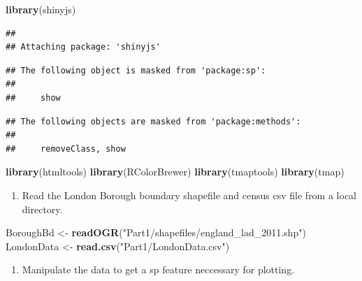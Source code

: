 \documentclass[]{article}
\newenvironment{Shaded}{\begin{snugshade}}{\end{snugshade}}
\newcommand{\KeywordTok}[1]{\textcolor[rgb]{0.13,0.29,0.53}{\textbf{#1}}}
\newcommand{\StringTok}[1]{\textcolor[rgb]{0.31,0.60,0.02}{#1}}
\newcommand{\NormalTok}[1]{#1}
\providecommand{\tightlist}{%
  \setlength{\itemsep}{0pt}\setlength{\parskip}{0pt}}
\begin{document}
\begin{Shaded}
\begin{Highlighting}[]
\KeywordTok{library}\NormalTok{(shinyjs)}
\end{Highlighting}
\end{Shaded}

\begin{verbatim}
## 
## Attaching package: 'shinyjs'
\end{verbatim}

\begin{verbatim}
## The following object is masked from 'package:sp':
## 
##     show
\end{verbatim}

\begin{verbatim}
## The following objects are masked from 'package:methods':
## 
##     removeClass, show
\end{verbatim}

\begin{Shaded}
\begin{Highlighting}[]
\KeywordTok{library}\NormalTok{(htmltools)}
\KeywordTok{library}\NormalTok{(RColorBrewer)}
\KeywordTok{library}\NormalTok{(tmaptools)}
\KeywordTok{library}\NormalTok{(tmap)}
\end{Highlighting}
\end{Shaded}

\begin{enumerate}
\def\labelenumi{\roman{enumi})}
\setcounter{enumi}{1}
\tightlist
\item
  Read the London Borough boundary shapefile and census csv file from a
  local directory.
\end{enumerate}

\begin{Shaded}
\begin{Highlighting}[]
\NormalTok{BoroughBd <-}\StringTok{ }\KeywordTok{readOGR}\NormalTok{(}\StringTok{"Part1/shapefiles/england_lad_2011.shp"}\NormalTok{)}
\NormalTok{LondonData <-}\StringTok{ }\KeywordTok{read.csv}\NormalTok{(}\StringTok{"Part1/LondonData.csv"}\NormalTok{)}
\end{Highlighting}
\end{Shaded}

\begin{enumerate}
\def\labelenumi{\roman{enumi})}
\setcounter{enumi}{2}
\tightlist
\item
  Manipulate the data to get a sp feature neccessary for plotting.
\end{enumerate}
\end{document}

